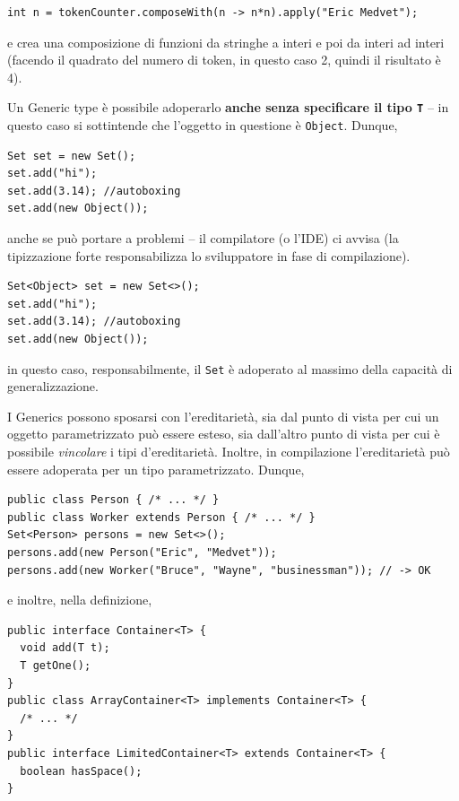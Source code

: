 \documentclass[\fontsizeclass,twocolumn]{\classname}
\theoremstyle{definition}
\theoremstyle{definition}
\begin{document}
\begin{lstlisting}
int n = tokenCounter.composeWith(n -> n*n).apply("Eric Medvet");
\end{lstlisting}

e crea una composizione di funzioni da stringhe a interi e poi da interi ad
interi (facendo il quadrato del numero di token, in questo caso 2, quindi il
risultato è 4).

Un Generic type è possibile adoperarlo \textbf{anche senza specificare il tipo
\texttt{T}} -- in questo caso si sottintende che l'oggetto in questione è
\texttt{Object}. Dunque,

\begin{lstlisting}
Set set = new Set();
set.add("hi");
set.add(3.14); //autoboxing
set.add(new Object());
\end{lstlisting}

anche se può portare a problemi -- il compilatore (o l'IDE) ci avvisa (la
tipizzazione forte responsabilizza lo sviluppatore in fase di compilazione).

\begin{lstlisting}
Set<Object> set = new Set<>();
set.add("hi");
set.add(3.14); //autoboxing
set.add(new Object());
\end{lstlisting}

in questo caso, responsabilmente, il \texttt{Set} è adoperato al massimo della
capacità di generalizzazione.

I Generics possono sposarsi con l'ereditarietà, sia dal punto di vista per cui
un oggetto parametrizzato può essere esteso, sia dall'altro punto di vista per
cui è possibile \emph{vincolare} i tipi d'ereditarietà. Inoltre, in
compilazione l'ereditarietà può essere adoperata per un tipo parametrizzato.
Dunque,

\begin{lstlisting}
public class Person { /* ... */ }
public class Worker extends Person { /* ... */ }
Set<Person> persons = new Set<>();
persons.add(new Person("Eric", "Medvet"));
persons.add(new Worker("Bruce", "Wayne", "businessman")); // -> OK
\end{lstlisting}

e inoltre, nella definizione,

\begin{lstlisting}
public interface Container<T> {
  void add(T t);
  T getOne();
}
public class ArrayContainer<T> implements Container<T> {
  /* ... */
}
public interface LimitedContainer<T> extends Container<T> {
  boolean hasSpace();
}
\end{lstlisting}
\end{document}
